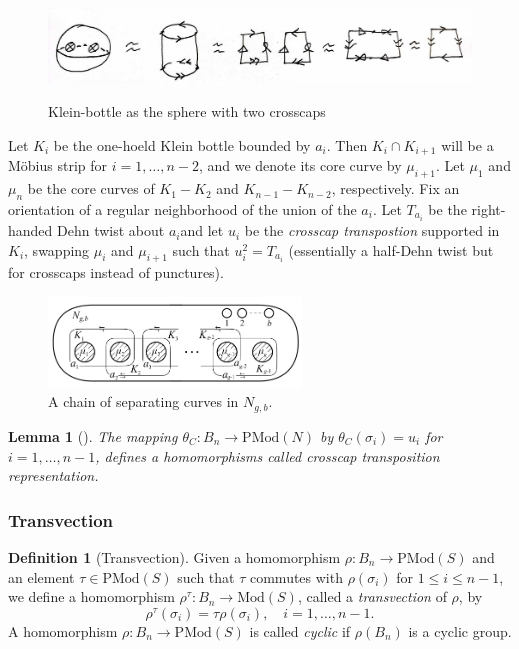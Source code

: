 \documentclass[reqno]{amsart}
\newtheorem{lemma}[theorem]{Lemma}
\theoremstyle{definition}
\newtheorem{definition}[theorem]{Definition}
\theoremstyle{remark}
\newcommand{\Mod}{{\mathrm{Mod}}}
\newcommand{\PMod}{{\mathrm{PMod}}}
\begin{document}
\begin{figure}[H]
    \centering
    \includegraphics[width=1.2\textwidth]{klein-bottle.jpg}
    \label{fig:klein-bottle}
    \caption{Klein-bottle as the sphere with two crosscaps}
\end{figure}

Let $K_i$ be the one-hoeld Klein bottle bounded by
$a_i$. Then $K_i \cap K_{i+1}$ will be a Möbius strip
for $i = 1, \ldots, n-2$, and we denote its core curve
by $\mu_{i+1}$. Let $\mu_1$ and $\mu_n$ be the core curves
of $K_1 - K_2$ and $K_{n-1} - K_{n-2}$, respectively.
Fix an orientation of a regular neighborhood of
the union of the $a_i$. Let $T_{a_i}$ be the right-handed
Dehn twist about $a_i$and let $u_i$ be the 
\textit{crosscap transpostion} supported
in $K_i$, swapping $\mu_i$ and $\mu_{i+1}$ such that
$u_i^2 = T_{a_i}$ (essentially a half-Dehn twist but for crosscaps
instead of punctures).

\begin{figure}[H]
    \centering
    \includegraphics[width=0.6\textwidth]{chain-separating-curves.png}
    \caption{A chain of separating curves in
    $N_{g,b}$.}
    \label{fig:chain-separating-curves-png}
\end{figure}


\begin{lemma}[]
    The mapping $\theta_{C} \colon B_n \to \PMod (N)$ by
    $\theta_C \left( \sigma_i \right) =u_i$ for
    $i = 1,\ldots, n-1$, defines a homomorphisms
    called crosscap transposition representation.
\end{lemma}


\subsubsection{Transvection}

\begin{definition}[Transvection]
    Given a homomorphism
    $\rho \colon B_n \to \PMod (S)$ and an element
    $\tau \in \PMod (S)$ such that
    $\tau$ commutes with $\rho\left( \sigma_i \right) $ 
    for $1 \le i \le n-1$, we define a homomorphism
    $\rho^{\tau} \colon B_n \to \Mod (S)$, called
    a \textit{transvection} of $\rho$, by
    \[
        \rho^{\tau} \left( \sigma_i \right) 
        = \tau \rho \left( \sigma_i \right) , \quad
        i = 1,\ldots, n-1.
    \] 
    A homomorphism $\rho \colon B_n \to \PMod (S)$ is called
    \textit{cyclic} if $\rho \left( B_n \right) $ is a 
    cyclic group. 
\end{definition}
\end{document}
